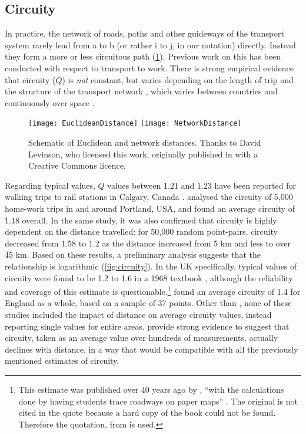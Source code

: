 \subsection{Circuity} \label{scircuity}   
In practice, the
network of roads, paths and other guideways of the transport system
rarely lead from a to b (or rather
i to j, in our notation) directly. Instead they
form a more or less circuitous path (\cref{fig:routes}). Previous work on this has
been conducted with respect to transport to work. There is strong empirical
evidence that circuity ($Q$) is \emph{not} constant, but varies depending on
the length of trip \citep{Levinson2009} and the structure of the transport
network \citep{parthasarathi2012network}, which varies between countries
\citep{Ballou2002} and continuously over space \citep{Barthelemy2011}.

\begin{figure}[h]
 \centering
 \texttt{[image: EuclideanDistance]}
  \texttt{[image: NetworkDistance]}
 \caption[Schematic of Euclidean and network distances]{Schematic of
 Euclidean and network distances. Thanks to David Levinson, who licensed this
 work, originally published in \citet{Levinson2009} with a Creative Commons licence.}
 \label{fig:routes}
\end{figure}

Regarding
typical values, $Q$ values between 1.21 and 1.23 have been reported for
walking trips to rail stations in Calgary, Canada \citep{O'Sullivan1996}.
\citet{Levinson2009} analysed the circuity of 5,000 home-work trips in and
around Portland, USA, and found an average circuity of 1.18 overall. In the
same study, it was also confirmed that
circuity is highly dependent on the distance travelled: for 50,000 random
point-pairs, circuity decreased from 1.58 to 1.2 as the distance increased from
5 km and less to over 45 km. Based on these results, a preliminary analysis
suggests that the relationship is logarithmic (\cref{fig:circuity}). In
the UK specifically, typical values of circuity were found to be
1.2 to 1.6 in a 1968 textbook \citep{bosco2012circs},
although the reliability and
coverage of this estimate is
questionable.\footnote{This estimate
was published over 40 years ago by \citet{cole1968quantitative},
``with the calculations done by having
students trace roadways on paper maps'' \citep[189]{bosco2012circs}.
The original is not cited in the quote because a hard copy of the book
could not be found. Therefore the quotation, from \citet{bosco2012circs}
is used.
}
\citet{Ballou2002} found an average circuity of 1.4 for England
as a whole, based on a sample of 37 points. Other than \citet{Levinson2009},
none of these studies
included the impact of distance on average circuity
values, instead reporting single values for entire areas.
\citet{Levinson2009} provide strong evidence to suggest that
circuity, taken as an average value over hundreds of measurements,
actually declines with distance, in a way that would be compatible
with all the previously mentioned estimates of circuity.

